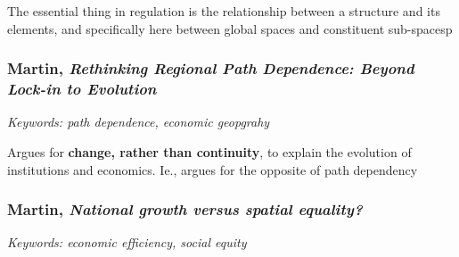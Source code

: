 \documentclass{article}
\begin{document}
\begin{outline}
	\1 The essential thing in regulation is the relationship between a structure and its elements, and specifically here between global spaces and constituent sub-spacesp
\end{outline}

\subsubsection{Martin, \textit{Rethinking Regional Path Dependence: Beyond Lock-in to Evolution}}

\textit{Keywords: path dependence, economic geopgrahy}

\begin{outline}
	\1 Argues for \textbf{change, rather than continuity}, to explain the evolution of institutions and economics. Ie., argues for the opposite of path dependency
\end{outline}

\subsubsection{Martin, \textit{National growth versus spatial equality?}}

\textit{Keywords: economic efficiency, social equity}
\end{document}
